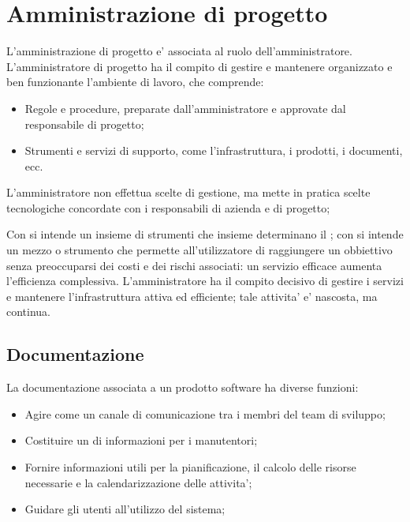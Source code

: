 \section{Amministrazione di progetto}

L'amministrazione di progetto e' associata al ruolo dell'amministratore.
L'amministratore di progetto ha il compito di gestire e mantenere organizzato e
ben funzionante l'ambiente di lavoro, che comprende:

\begin{itemize}
  \item Regole e procedure, preparate dall'amministratore e approvate dal
    responsabile di progetto;
  \item Strumenti e servizi di supporto, come l'infrastruttura, i prodotti, i
    documenti, ecc. 
\end{itemize}

L'amministratore non effettua scelte di gestione, ma mette in pratica scelte
tecnologiche concordate con i responsabili di azienda e di progetto;

Con  si intende un insieme di strumenti che insieme
determinano il ; con  si intende un
mezzo o strumento che permette all'utilizzatore di raggiungere un obbiettivo
senza preoccuparsi dei costi e dei rischi associati: un servizio efficace
aumenta l'efficienza complessiva. L'amministratore ha il compito decisivo di
gestire i servizi e mantenere l'infrastruttura attiva ed efficiente; tale
attivita' e' nascosta, ma continua.

\subsection{Documentazione}

La documentazione associata a un prodotto software ha diverse funzioni:

\begin{itemize}
	\item Agire come un canale di comunicazione tra i membri del team di sviluppo;
	\item Costituire un  di informazioni per i manutentori;
  \item Fornire informazioni utili per la pianificazione, il calcolo delle
    risorse necessarie e la calendarizzazione delle attivita';
	\item Guidare gli utenti all'utilizzo del sistema;
\end{itemize}

